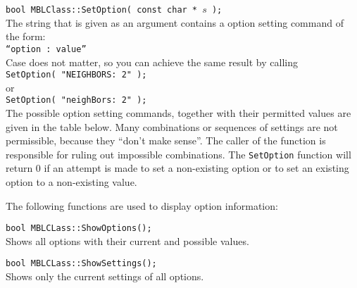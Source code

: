 \documentclass{report}
\begin{document}
\begin{description}
\item {\tt bool MBLClass::SetOption( const char * $s$ );}\\ 
The string that is given as an argument contains a option setting
command of the form:\\
{\tt ``option : value''}\\
Case does not matter, so you can achieve the same result by calling\\
\noindent
{\tt SetOption( "NEIGHBORS: 2" );}\\ 
or\\
\noindent
{\tt SetOption( "neighBors: 2" );}\\ 
The possible option setting commands, together with their permitted
values are given in the table below. Many combinations or sequences of
settings are not permissible, because they ``don't make sense''.  The
caller of the function is responsible for ruling out impossible
combinations. The {\tt SetOption} function will return 0 if an attempt
is made to set a non-existing option or to set an existing option to a
non-existing value.

\item The following functions are used to display option information:

\item {\tt bool MBLCLass::ShowOptions();}\\
Shows all options with their current and possible values.

\item {\tt bool MBLCLass::ShowSettings();}\\
Shows only the current settings of all options.

\end{description}
\end{document}
